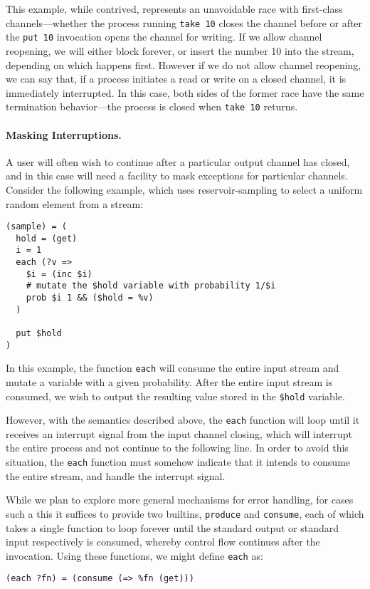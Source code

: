\documentclass[english,preprint,JIP]{ipsj}
\begin{document}
This example, while contrived, represents an unavoidable race with first-class channels---whether the process running \verb/take 10/ closes the channel before or
after the \verb/put 10/ invocation opens the channel for writing. If we allow channel reopening, we will either block forever, or insert the number 10 into the stream, depending on which happens first. However if we do not allow channel reopening, we can say that, if a process initiates a read or write on a closed channel, it is immediately interrupted. In this case, both sides of the former race have the same termination behavior---the process is closed when \verb/take 10/ returns.

\paragraph{Masking Interruptions.}

A user will often wish to continue after a particular output channel has closed, and in this case will need a facility to mask exceptions for particular channels. Consider the following example, which uses reservoir-sampling to select a uniform random element from a stream:
\begin{lstlisting}
(sample) = (
  hold = (get)
  i = 1
  each (?v =>
    $i = (inc $i)
    # mutate the $hold variable with probability 1/$i
    prob $i 1 && ($hold = %v)
  )

  put $hold
)
\end{lstlisting}

In this example, the function \verb/each/ will consume the entire input stream and mutate a variable with a given probability. After the entire input stream is consumed, we wish to output the resulting value stored in the \verb/$hold/ variable.

However, with the semantics described above, the \verb/each/ function will loop until it receives an interrupt signal from the input channel closing, which will interrupt the entire process and not continue to the following line. In order to avoid this situation, the \verb/each/ function must somehow indicate that it intends to consume the entire stream, and handle the interrupt signal.

While we plan to explore more general mechanisms for error handling, for cases such a this it suffices to provide two builtins, \verb/produce/ and \verb/consume/, each of which takes a single function to loop forever until the standard output or standard input respectively is consumed, whereby control flow continues after the invocation. Using these functions, we might define \verb/each/ as:
\begin{lstlisting}
(each ?fn) = (consume (=> %fn (get)))
\end{lstlisting}
\end{document}
